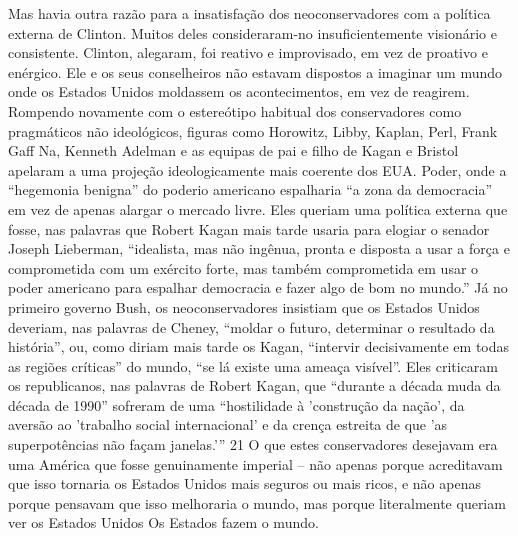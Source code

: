 Mas havia outra razão para a insatisfação dos neoconservadores com a política externa de Clinton. Muitos deles consideraram-no insuficientemente visionário e consistente. Clinton, alegaram, foi reativo e improvisado, em vez de proativo e enérgico. Ele e os seus conselheiros não estavam dispostos a imaginar um mundo onde os Estados Unidos moldassem os acontecimentos, em vez de reagirem. Rompendo novamente com o estereótipo habitual dos conservadores como pragmáticos não ideológicos, figuras como Horowitz, Libby, Kaplan, Perl, Frank Gaff Na, Kenneth Adelman e as equipas de pai e filho de Kagan e Bristol apelaram a uma projeção ideologicamente mais coerente dos EUA. Poder, onde a “hegemonia benigna” do poderio americano espalharia “a zona da democracia” em vez de apenas alargar o mercado livre. Eles queriam uma política externa que fosse, nas palavras que Robert Kagan mais tarde usaria para elogiar o senador Joseph Lieberman, “idealista, mas não ingênua, pronta e disposta a usar a força e comprometida com um exército forte, mas também comprometida em usar o poder americano para espalhar democracia e fazer algo de bom no mundo.” Já no primeiro governo Bush, os neoconservadores insistiam que os Estados Unidos deveriam, nas palavras de Cheney, “moldar o futuro, determinar o resultado da história”, ou, como diriam mais tarde os Kagan, “intervir decisivamente em todas as regiões críticas” do mundo, “se lá existe uma ameaça visível”. Eles criticaram os republicanos, nas palavras de Robert Kagan, que “durante a década muda da década de 1990” sofreram de uma “hostilidade à 'construção da nação', da aversão ao 'trabalho social internacional' e da crença estreita de que 'as superpotências não façam janelas.'”
 {\color{blue} 21}  
O que estes conservadores desejavam era uma América que fosse genuinamente imperial – não apenas porque acreditavam que isso tornaria os Estados Unidos mais seguros ou mais ricos, e não apenas porque pensavam que isso melhoraria o mundo, mas porque literalmente queriam ver os Estados Unidos Os Estados fazem o mundo.
 
\par
 

